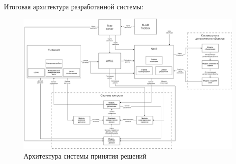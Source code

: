 Итоговая архитектура разработанной системы:

\begin{figure}[H]
    \centering
    \includegraphics[width=1.0\textwidth]{images/chap_3/full-system.drawio.png}
    \caption{Архитектура системы принятия решений}
    \label{fig:full-system}
\end{figure}

\endinput